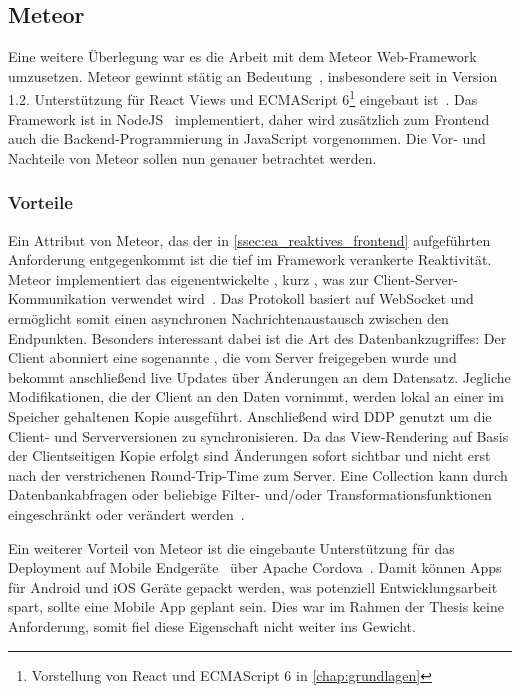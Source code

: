 \subsection{Meteor}
\label{ssec:el_meteor}

Eine weitere Überlegung war es die Arbeit mit dem Meteor Web-Framework
umzusetzen.  Meteor gewinnt stätig an Bedeutung~\cite{hotframeworks},
insbesondere seit in Version 1.2. Unterstützung für React Views und ECMAScript
6\footnote{Vorstellung von React und ECMAScript 6 in \cref{chap:grundlagen}}
eingebaut ist~\cite{meteor12}.  Das Framework ist in NodeJS~\cite{nodejs}
implementiert, daher wird zusätzlich zum Frontend auch die
Backend-Programmierung in JavaScript vorgenommen.  Die Vor- und Nachteile von
Meteor sollen nun genauer betrachtet werden.

\subsubsection{Vorteile}
\label{sssec:elm_vorteile}

Ein Attribut von Meteor, das der in \cref{ssec:ea_reaktives_frontend}
aufgeführten Anforderung entgegenkommt ist die tief im Framework verankerte
Reaktivität.  Meteor implementiert das eigenentwickelte
, kurz , was
zur Client-Server-Kommunikation verwendet wird~\cite{ddp}.  Das Protokoll
basiert auf WebSocket und ermöglicht somit einen asynchronen
Nachrichtenaustausch zwischen den Endpunkten.  Besonders interessant dabei ist
die Art des Datenbankzugriffes:  Der Client abonniert eine sogenannte
, die vom Server freigegeben wurde und bekommt
anschließend live Updates über Änderungen an dem Datensatz.  Jegliche
Modifikationen, die der Client an den Daten vornimmt, werden lokal an einer im
Speicher gehaltenen Kopie ausgeführt.  Anschließend wird DDP genutzt um die
Client- und Serverversionen zu synchronisieren.  Da das View-Rendering auf Basis
der Clientseitigen Kopie erfolgt sind Änderungen sofort sichtbar und nicht erst
nach der verstrichenen Round-Trip-Time zum Server.  Eine Collection kann durch
Datenbankabfragen oder beliebige Filter- und/oder Transformationsfunktionen
eingeschränkt oder verändert werden~\cite{meteordoc}.

Ein weiterer Vorteil von Meteor ist die eingebaute Unterstützung für das
Deployment auf Mobile Endgeräte~\cite{meteormobile} über Apache
Cordova~\cite{cordova}.  Damit können Apps für Android und iOS Geräte gepackt
werden, was potenziell Entwicklungsarbeit spart, sollte eine Mobile App geplant
sein.  Dies war im Rahmen der Thesis keine Anforderung, somit fiel diese
Eigenschaft nicht weiter ins Gewicht.

